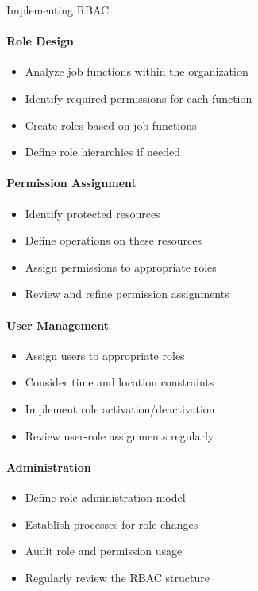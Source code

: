 \begin{KR}{Implementing RBAC}\\
\paragraph{Role Design}
\begin{itemize}
    \item Analyze job functions within the organization
    \item Identify required permissions for each function
    \item Create roles based on job functions
    \item Define role hierarchies if needed
\end{itemize}

\paragraph{Permission Assignment}
\begin{itemize}
    \item Identify protected resources
    \item Define operations on these resources
    \item Assign permissions to appropriate roles
    \item Review and refine permission assignments
\end{itemize}

\paragraph{User Management}
\begin{itemize}
    \item Assign users to appropriate roles
    \item Consider time and location constraints
    \item Implement role activation/deactivation
    \item Review user-role assignments regularly
\end{itemize}

\paragraph{Administration}
\begin{itemize}
    \item Define role administration model
    \item Establish processes for role changes
    \item Audit role and permission usage
    \item Regularly review the RBAC structure
\end{itemize}
\end{KR}

